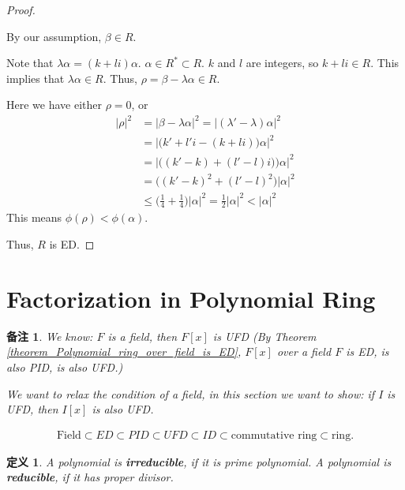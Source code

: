 \documentclass[utf8]{ctexbook}
\newtheorem{definition}{定义}[section]
\newtheorem{memo}{备注}[section]
\begin{document}
\begin{proof}
\begin{enumerate}
{By our assumption, $\beta \in R$.

Note that $\lambda \alpha = (k + l i) \alpha$. $\alpha \in R^* \subset R$. $k$ and $l$ are integers, so $k + l i \in R$. This implies that $\lambda \alpha \in R$. Thus, $ \rho = \beta - \lambda \alpha \in R $.

Here we have either $\rho =0$, or 
\begin{align*}
| \rho |^2 & = | \beta - \lambda \alpha |^2 = | (\lambda' - \lambda) \alpha |^2 \\
& = | \Big( k' + l' i - (k + l i) \Big) \alpha |^2 \\
& = | \Big( (k' - k) + (l' - l) i) \Big) \alpha |^2 \\
& = \Big( (k' - k)^2 + (l' - l)^2 \Big) | \alpha|^2 \\
& \leq \Big( \frac{1}{4} + \frac{1}{4} \Big) | \alpha|^2 = \frac{1}{2} | \alpha|^2  < | \alpha|^2 
\end{align*}
This means $\phi(\rho) < \phi(\alpha)$.
}
\end{enumerate}

Thus, $R$ is ED.

\end{proof}

\section{Factorization in Polynomial Ring}

\begin{memo}
We know: $F$ is a field, then $F[x]$ is UFD (By Theorem \ref{theorem_Polynomial_ring_over_field_is_ED}, $F[x]$ over a field $F$ is ED, is also PID, is also UFD.)

We want to relax the condition of a field, in this section we want to show: if $I$ is UFD, then $I[x]$ is also UFD.

\begin{align*}
\mbox{Field} \subset ED \subset PID \subset UFD \subset ID \subset \mbox{commutative ring} \subset \mbox{ring} .
\end{align*}

\end{memo}

\begin{definition}
A polynomial is \textbf{irreducible}, if it is prime polynomial. A polynomial is \textbf{reducible}, if it has proper divisor.
\end{definition}
\end{document}
